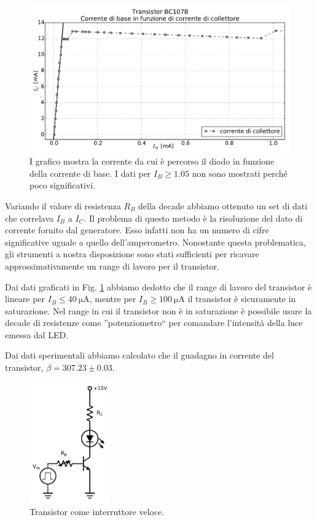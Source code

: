 \begin{figure}
	\includegraphics[width=119mm]{saturazione.pdf}
	\caption{I grafico mostra la corrente da cui è percorso il diodo in funzione della corrente di base. I dati per $I_B \geq 1.05$ non sono mostrati perché poco significativi.}
	\label{fig:saturazione}
\end{figure}

Variando il valore di resistenza $R_B$ della decade abbiamo ottenuto un set di dati che correlava $I_B$ a $I_C$.
Il problema di questo metodo è la risoluzione del dato di corrente fornito dal generatore.
Esso infatti non ha un numero di cifre significative uguale a quello dell'amperometro.
Nonostante questa problematica, gli strumenti a nostra disposizione sono stati sufficienti per ricavare approssimativamente un range di lavoro per il transistor.

Dai dati graficati in Fig. \ref{fig:saturazione} abbiamo dedotto che il range di lavoro del transistor è lineare per $I_B \leq \SI{40}{\micro\ampere}$, mentre per $I_B \geq \SI{100}{\micro\ampere}$ il transistor è sicuramente in saturazione. Nel range in cui il transistor non è in saturazione è possibile usare la decade di resistenze come ''potenziometro`` per comandare l'intensità della luce emessa dal LED.

Dai dati sperimentali abbiamo calcolato che il guadagno in corrente del transistor, $\beta=307.23 \pm 0.03$.
\newpage
\begin{figure}
	\includegraphics[width=35mm]{cc2.pdf}
	\caption{Transistor come interruttore veloce.}
	\label{fig:cc2}
\end{figure}
